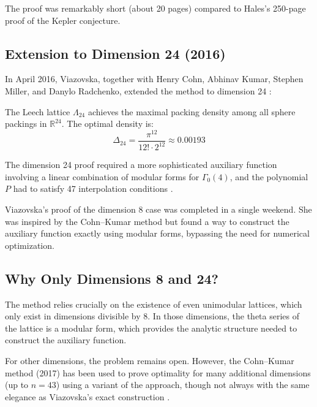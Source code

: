 The proof was remarkably short (about 20 pages) compared to Hales's 250-page proof of the Kepler conjecture.

\subsection{Extension to Dimension 24 (2016)}

In April 2016, Viazovska, together with Henry Cohn, Abhinav Kumar, Stephen Miller, and Danylo Radchenko, extended the method to dimension 24 \cite{cohn2017}:

\begin{theorem}
The Leech lattice $\Lambda_{24}$ achieves the maximal packing density among all sphere packings in $\mathbb{R}^{24}$. The optimal density is:
\begin{equation}
\Delta_{24} = \frac{\pi^{12}}{12! \cdot 2^{12}} \approx 0.00193
\end{equation}
\end{theorem}

The dimension 24 proof required a more sophisticated auxiliary function involving a linear combination of modular forms for $\Gamma_0(4)$, and the polynomial $P$ had to satisfy 47 interpolation conditions \cite{cohn2017}.

\begin{highlightbox}
Viazovska's proof of the dimension 8 case was completed in a single weekend. She was inspired by the Cohn--Kumar method but found a way to construct the auxiliary function exactly using modular forms, bypassing the need for numerical optimization.
\end{highlightbox}

\subsection{Why Only Dimensions 8 and 24?}

The method relies crucially on the existence of even unimodular lattices, which only exist in dimensions divisible by 8. In those dimensions, the theta series of the lattice is a modular form, which provides the analytic structure needed to construct the auxiliary function.

For other dimensions, the problem remains open. However, the Cohn--Kumar method (2017) has been used to prove optimality for many additional dimensions (up to $n = 43$) using a variant of the approach, though not always with the same elegance as Viazovska's exact construction \cite{cohn2017b}.

